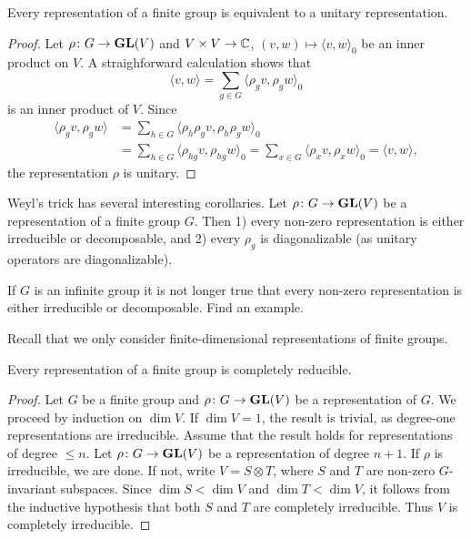 \begin{proposition}
    Every representation of a finite group is equivalent to a unitary representation.
\end{proposition}

\begin{proof}
    Let $\rho\colon G\to\mathbf{GL}(V)$ and $V\times V\to\mathbb{C}$, $(v,w)\mapsto\langle v,w\rangle_0$ be an inner
    product on $V$. A straighforward calculation shows that 
    \[
    \langle v,w\rangle=\sum_{g\in G}\langle\rho_gv,\rho_gw\rangle_0
    \]
    is an inner product of $V$. Since
    \begin{align*}
    \langle\rho_gv,\rho_gw\rangle&=\sum_{h\in G}\langle\rho_h\rho_gv,\rho_h\rho_gw\rangle_0\\
    &=\sum_{h\in G}\langle\rho_{hg}v,\rho_{hg}w\rangle_0=\sum_{x\in G}\langle\rho_xv,\rho_xw\rangle_0=\langle v,w\rangle,
    \end{align*}
    the representation $\rho$ is unitary.
\end{proof}

Weyl's trick has several interesting corollaries. Let $\rho\colon G\to\mathbf{GL}(V)$ be a representation
of a finite group $G$. Then 1) every non-zero representation is either 
irreducible or decomposable, and 2) every $\rho_g$ is diagonalizable 
(as unitary operators are diagonalizable). 

\begin{exercise}
    If $G$ is an infinite group it is not longer true that every non-zero representation
    is either irreducible or decomposable. Find an example. 
\end{exercise}

Recall that we only consider finite-dimensional representations of finite groups. 

\begin{theorem}[Maschke]
    Every representation of a finite group is completely reducible. 
\end{theorem}

\begin{proof}
    Let $G$ be a finite group and $\rho\colon G\to\mathbf{GL}(V)$ be a representation of $G$. We proceed
    by induction on $\dim V$. 
    If $\dim V=1$, the result is trivial, as degree-one representations are irreducible. Assume that
    the result holds for representations of degree $\leq n$. Let $\rho\colon G\to\mathbf{GL}(V)$ be a representation
    of degree $n+1$. If $\rho$ is irreducible, we are done. If not, write $V=S\otimes T$, where $S$ and $T$
    are non-zero $G$-invariant subspaces. Since $\dim S<\dim V$ and $\dim T<\dim V$, it follows from 
    the inductive hypothesis that 
    both $S$ and $T$ are completely irreducible. Thus $V$ is completely irreducible. 
\end{proof}


